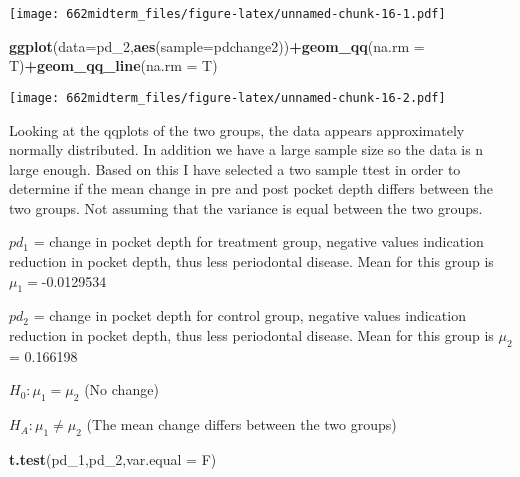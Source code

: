 \documentclass[]{article}
\newenvironment{Shaded}{\begin{snugshade}}{\end{snugshade}}
\newcommand{\KeywordTok}[1]{\textcolor[rgb]{0.13,0.29,0.53}{\textbf{#1}}}
\newcommand{\DataTypeTok}[1]{\textcolor[rgb]{0.13,0.29,0.53}{#1}}
\newcommand{\DecValTok}[1]{\textcolor[rgb]{0.00,0.00,0.81}{#1}}
\newcommand{\OperatorTok}[1]{\textcolor[rgb]{0.81,0.36,0.00}{\textbf{#1}}}
\newcommand{\NormalTok}[1]{#1}
\begin{document}
\texttt{[image: 662midterm\_files/figure-latex/unnamed-chunk-16-1.pdf]}

\begin{Shaded}
\begin{Highlighting}[]
\KeywordTok{ggplot}\NormalTok{(}\DataTypeTok{data=}\NormalTok{pd_}\DecValTok{2}\NormalTok{,}\KeywordTok{aes}\NormalTok{(}\DataTypeTok{sample=}\NormalTok{pdchange2))}\OperatorTok{+}\KeywordTok{geom_qq}\NormalTok{(}\DataTypeTok{na.rm =}\NormalTok{ T)}\OperatorTok{+}\KeywordTok{geom_qq_line}\NormalTok{(}\DataTypeTok{na.rm =}\NormalTok{ T)}
\end{Highlighting}
\end{Shaded}

\texttt{[image: 662midterm\_files/figure-latex/unnamed-chunk-16-2.pdf]}

\begin{Shaded}
\end{Shaded}

Looking at the qqplots of the two groups, the data appears approximately
normally distributed. In addition we have a large sample size so the
data is n large enough. Based on this I have selected a two sample ttest
in order to determine if the mean change in pre and post pocket depth
differs between the two groups. Not assuming that the variance is equal
between the two groups.

\(pd_1\) = change in pocket depth for treatment group, negative values
indication reduction in pocket depth, thus less periodontal disease.
Mean for this group is \(\mu_1=\)-0.0129534

\(pd_2\) = change in pocket depth for control group, negative values
indication reduction in pocket depth, thus less periodontal disease.
Mean for this group is \(\mu_2\) = 0.166198

\(H_0: \mu_1=\mu_2\) (No change)

\(H_A: \mu_1 \neq \mu_2\) (The mean change differs between the two
groups)

\begin{Shaded}
\begin{Highlighting}[]
\KeywordTok{t.test}\NormalTok{(pd_}\DecValTok{1}\NormalTok{,pd_}\DecValTok{2}\NormalTok{,}\DataTypeTok{var.equal =}\NormalTok{ F)}
\end{Highlighting}
\end{Shaded}
\end{document}
